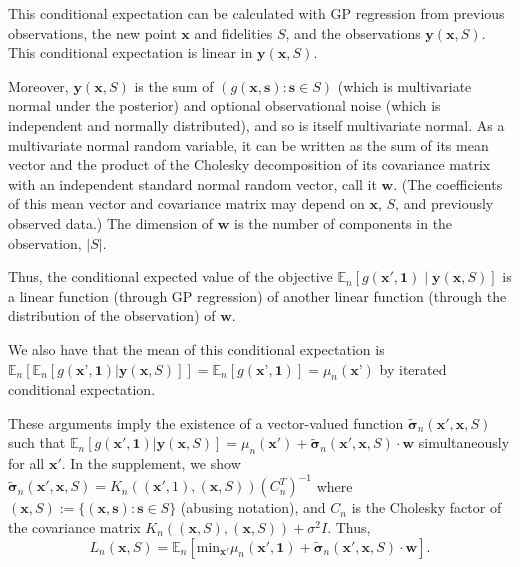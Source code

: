 \documentclass[letterpaper]{article}
\newcommand{\E}{\mathbb{E}}
\providecommand{\diag}{{\rm diag}}
\newcommand{\x}{\mathbf{x}}
\newcommand{\s}{\mathbf{s}}
\newcommand{\Y}{\mathbf{y}}
\renewcommand{\S}{S}
\newcommand{\w}{\mathbf{w}}
\newcommand{\chol}{C}
\newcommand{\sigmatilde}{\tilde{\boldsymbol{\sigma}}}
\newcommand{\one}{\mathbf{1}}
\newcommand{\xS}{(\x,\S)} %
\newcommand{\loss}{L}
\numberwithin{equation}{section}
\begin{document}
This conditional expectation can be calculated with GP regression from previous observations, the new point $\x$ and fidelities $\S$, and the observations $\Y(\x,\S)$.  This conditional expectation is linear in $\Y(\x,\S)$.

Moreover, $\Y(\x,\S)$ is the sum of $( g(\x,\s) : \s \in \S)$ (which is multivariate normal under the posterior) and optional observational noise (which is independent and normally distributed), and so is itself multivariate normal.
As a multivariate normal random variable, it can be written as the sum of its mean vector and the product of the Cholesky decomposition of its covariance matrix with an independent standard normal random vector, call it $\w$.  (The coefficients of this mean vector and covariance matrix may depend on $\x$, $\S$, and previously observed data.)  The dimension of $\w$ is the number of components in the observation, $|\S|$.

Thus, the conditional expected value of the objective $\E_n\left[g(\x',\one) \mid \Y(\x,\S)\right]$ is a linear function (through GP regression) of another linear function (through the distribution of the observation) of $\w$.

We also have that the mean of this conditional expectation is
$\E_n[\E_n[g(\x’,\one) | \Y(\x,\S) ] ] =
\E_n[g(\x’,\one) ] = \mu_n(\x’)$ by iterated conditional expectation.

These arguments imply the existence of a vector-valued function $\sigmatilde_n(\x',\x,\S)$ such that
$\E_n[g(\x',\one) | \Y(\x,\S)]
= \mu_n(\x') + \sigmatilde_n(\x',\x,\S)\cdot \w$ simultaneously for all $\x'$.
In the supplement, we show 
$\sigmatilde_n(\x',\x,\S)= K_n\left((\x', 1), \xS\right) (\chol_{n}^T)^{-1}$
where $\xS := \{(\x, \s): \s \in \S\}$ (abusing notation), and $\chol_{n}$ is the Cholesky factor of the covariance matrix $K_n\left(\xS, \xS \right)+\sigma^2 I$.
Thus, 
\begin{equation*}
\loss_{n}\left(\x,\S\right)=\mathbb{E}_{n}\left[\mbox{min}_{\x'} \mu_n\left(\x',\one\right)+\sigmatilde_{n}\left(\x', \x, \S\right)\cdot \w\right].
\end{equation*}

\end{document}
